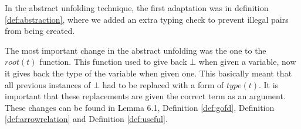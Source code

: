 In the abstract unfolding technique, the first adaptation was in definition \ref{def:abstraction}, where we added an extra typing check to prevent illegal pairs from being created. 

The most important change in the abstract unfolding was the one to the $\textit{root}(t)$ function. This function used to give back $\bot$ when given a variable, now it gives back the type of the variable when given one. This basically meant that all previous instances of $\bot$ had to be replaced with a form of $\textit{type}(t)$. It is important that these replacements are given the correct term as an argument. These changes can be found in Lemma 6.1, Definition \ref{def:gofd}, Definition \ref{def:arrowrelation} and Definition \ref{def:useful}.
